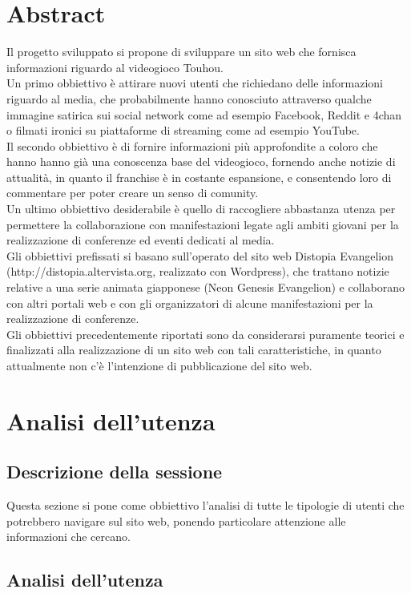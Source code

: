 \documentclass[openany, a4paper, 12pt]{report}
\begin{document}
	\chapter{Abstract}
	Il progetto sviluppato si propone di sviluppare un sito web che fornisca informazioni riguardo al videogioco Touhou.\\
	Un primo obbiettivo è attirare nuovi utenti che richiedano delle informazioni riguardo al media, che probabilmente hanno conosciuto attraverso qualche immagine satirica sui social network come ad esempio Facebook, Reddit e 4chan o filmati ironici su piattaforme di streaming come ad esempio YouTube.\\
	Il secondo obbiettivo è di fornire informazioni più approfondite a coloro che hanno hanno già una conoscenza base del videogioco, fornendo anche notizie di attualità, in quanto il franchise è in costante espansione, e consentendo loro di commentare per poter creare un senso di comunity.\\
	Un ultimo obbiettivo desiderabile è quello di raccogliere abbastanza utenza per permettere la collaborazione con manifestazioni legate agli ambiti giovani per la realizzazione di conferenze ed eventi dedicati al media.\\
	Gli obbiettivi prefissati si basano sull'operato del sito web Distopia Evangelion (http://distopia.altervista.org, realizzato con Wordpress), che trattano notizie relative a una serie animata giapponese (Neon Genesis Evangelion) e collaborano con altri portali web e con gli organizzatori di alcune manifestazioni per la realizzazione di conferenze.\\
	Gli obbiettivi precedentemente riportati sono da considerarsi puramente teorici e finalizzati alla realizzazione di un sito web con tali caratteristiche, in quanto attualmente non c'è l'intenzione di pubblicazione del sito web.
	
	\chapter{Analisi dell'utenza}
	\section{Descrizione della sessione}
	Questa sezione si pone come obbiettivo l'analisi di tutte le tipologie di utenti che potrebbero navigare sul sito web, ponendo particolare attenzione alle informazioni che cercano.
	\section{Analisi dell'utenza}
\end{document}
